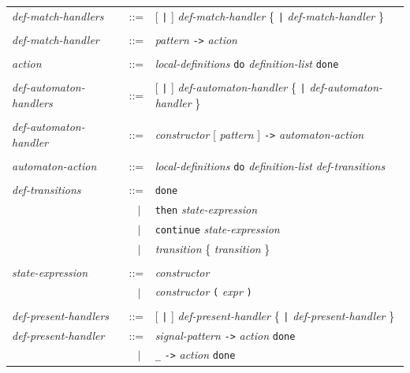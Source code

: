 \documentclass[11pt,titlepage,twoside]{report}
\newcommand{\alt}{\;|\;}
\newcommand{\Then}{\mbox{{\tt then}}}
\newcommand{\Minusgreater}{\mbox{{\tt ->}}}
\newcommand{\Continue}{\mbox{\tt continue}}
\newcommand{\Do}{\mbox{\tt do}}
\newcommand{\Done}{\mbox{\tt done}}
\newcommand{\term}[1]{{\tt #1}}
\newcommand{\nterm}[1]{{\em #1}}
\begin{document}
\begin{center}
\begin{tabular}{lcl}
\nterm{def-match-handlers}
   & ::=        & [ \term{|} ] \nterm{def-match-handler}
                  \{ \term{|} \nterm{def-match-handler} \} 
\\ \\
\nterm{def-match-handler}
   & ::=        & \nterm{pattern} \term{\Minusgreater} \nterm{action}
\\ \\
\nterm{action}                  
   & ::=        & \nterm{local-definitions}
                  \term{\Do} \nterm{definition-list} \term{\Done}
\\ \\
\nterm{def-automaton-handlers}
   & ::=        & [ \term{|} ] \nterm{def-automaton-handler}
                  \{ \term{|} \nterm{def-automaton-handler} \} 
\\ \\
\nterm{def-automaton-handler}
   & ::=        & \nterm{constructor} [ \nterm{pattern} ] \term{->}
                  \nterm{automaton-action}
\\ \\
\nterm{automaton-action}
   & ::=        & \nterm{local-definitions}
                  \term{\Do} \nterm{definition-list} \nterm{def-transitions}
\\ \\
\nterm{def-transitions}
   & ::=        & \term{\Done} \\
   & $\;\;\alt$ & \term{\Then} \nterm{state-expression} \\
   & $\;\;\alt$ & \term{\Continue} \nterm{state-expression} \\
   & $\;\;\alt$ & \nterm{transition} \{ \nterm{transition} \}
\\ \\
\nterm{state-expression}
   & ::=        & \nterm{constructor} \\
   & $\;\;\alt$ & \nterm{constructor} \term{(} \nterm{expr} \term{)}
\\ \\
\nterm{def-present-handlers}
   & ::=        & [ \term{|} ] \nterm{def-present-handler}
                  \{ \term{|} \nterm{def-present-handler} \} 
\\
\nterm{def-present-handler}
   & ::=        & \nterm{signal-pattern} \term{->} 
                  \nterm{action} \term{\Done} \\
   & $\;\;\alt$ & \term{\_} \term{->} \nterm{action} \term{\Done}
\end{tabular}
\end{center}
\end{document}
